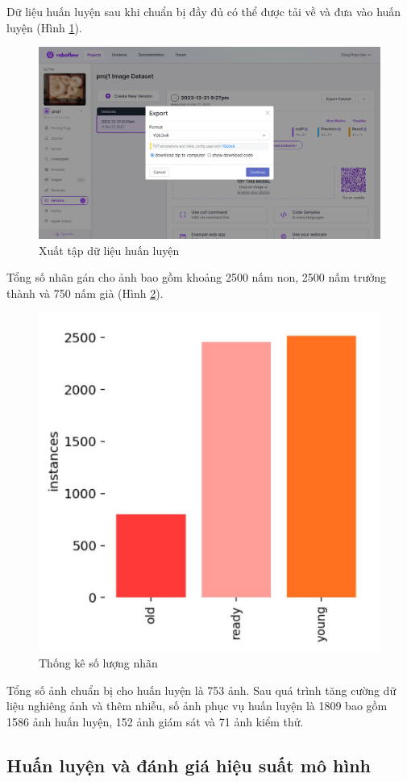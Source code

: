 Dữ liệu huấn luyện sau khi chuẩn bị đầy đủ có thể được tải về và đưa vào huấn luyện (Hình \ref{fig:export-dataset}).
\begin{figure}[H]
    \centering
    \includegraphics[width=0.85\linewidth]{images/export-dataset.png}
    \caption{Xuất tập dữ liệu huấn luyện}
    \label{fig:export-dataset}
\end{figure}

Tổng số nhãn gán cho ảnh bao gồm khoảng 2500 nấm non, 2500 nấm trưởng thành và 750 nấm già (Hình \ref{fig:instances-graph}).
\begin{figure}
    \centering
    \includegraphics[width=0.55\linewidth]{images/instances-graph.png}
    \caption{Thống kê số lượng nhãn}
    \label{fig:instances-graph}
\end{figure}


Tổng số ảnh chuẩn bị cho huấn luyện là 753 ảnh. Sau quá trình tăng cường dữ liệu nghiêng ảnh và thêm nhiễu, số ảnh phục vụ huấn luyện là 1809 bao gồm 1586 ảnh huấn luyện, 152 ảnh giám sát và 71 ảnh kiểm thử.


\subsection{Huấn luyện và đánh giá hiệu suất mô hình}

